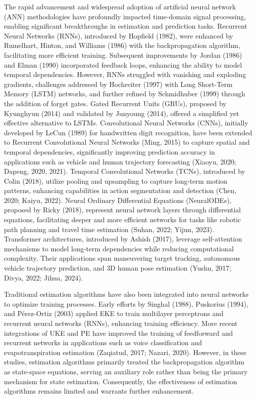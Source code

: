 \documentclass[sn-nature]{sn-jnl}%
\theoremstyle{thmstyleone}%
\theoremstyle{thmstyletwo}%
\theoremstyle{thmstylethree}%
\begin{document}
The rapid advancement and widespread adoption of artificial neural network (ANN) methodologies have profoundly impacted time-domain signal processing, enabling significant breakthroughs in estimation and prediction tasks. Recurrent Neural Networks (RNNs), introduced by Hopfield (1982), were enhanced by Rumelhart, Hinton, and Williams (1986) with the backpropagation algorithm, facilitating more efficient training. Subsequent improvements by Jordan (1986) and Elman (1990) incorporated feedback loops, enhancing the ability to model temporal dependencies. However, RNNs struggled with vanishing and exploding gradients, challenges addressed by Hochreiter (1997) with Long Short-Term Memory (LSTM) networks, and further refined by Schmidhuber (1999) through the addition of forget gates. Gated Recurrent Units (GRUs), proposed by Kyunghyun (2014) and validated by Junyoung (2014), offered a simplified yet effective alternative to LSTMs. Convolutional Neural Networks (CNNs), initially developed by LeCun (1989) for handwritten digit recognition, have been extended to Recurrent Convolutional Neural Networks (Ming, 2015) to capture spatial and temporal dependencies, significantly improving prediction accuracy in applications such as vehicle and human trajectory forecasting (Xiaoyu, 2020; Dapeng, 2020, 2021). Temporal Convolutional Networks (TCNs), introduced by Colin (2018), utilize pooling and upsampling to capture long-term motion patterns, enhancing capabilities in action segmentation and detection (Chen, 2020; Kaiyu, 2022). Neural Ordinary Differential Equations (NeuralODEs), proposed by Ricky (2018), represent neural network layers through differential equations, facilitating deeper and more efficient networks for tasks like robotic path planning and travel time estimation (Suhan, 2022; Yijun, 2023). Transformer architectures, introduced by Ashish (2017), leverage self-attention mechanisms to model long-term dependencies while reducing computational complexity. Their applications span maneuvering target tracking, autonomous vehicle trajectory prediction, and 3D human pose estimation (Yushu, 2017; Divya, 2022; Jihua, 2024). 

Traditional estimation algorithms have also been integrated into neural networks to optimize training processes. Early efforts by Singhal (1988), Puskorius (1994), and Pérez-Ortiz (2003) applied EKE to train multilayer perceptrons and recurrent neural networks (RNNs), enhancing training efficiency. More recent integrations of UKE and PE have improved the training of feedforward and recurrent networks in applications such as voice classification and evapotranspiration estimation (Zaqiatud, 2017; Nazari, 2020). However, in these studies, estimation algorithms primarily treated the backpropagation algorithm as state-space equations, serving an auxiliary role rather than being the primary mechanism for state estimation. Consequently, the effectiveness of estimation algorithms remains limited and warrants further enhancement.
\end{document}
